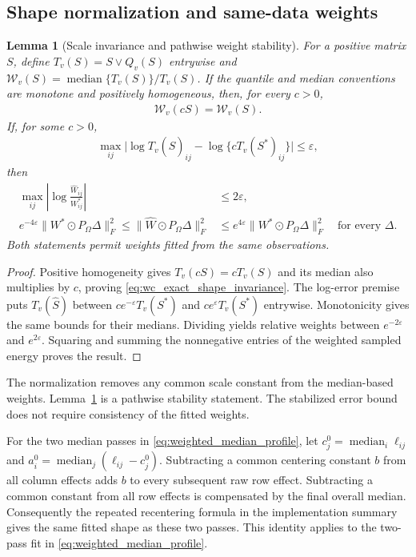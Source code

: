 \documentclass[numsec,webpdf,modern,large,namedate]{oup-authoring-template}
\theoremstyle{plain}
\newtheorem{slemma}{Lemma}%
\theoremstyle{remark}
\newif\ifmarkchanges
\newenvironment{revision}{\begingroup\ifmarkchanges\color{red}\fi}{\endgroup}
\begin{document}
\begin{revision}
\subsection{Shape normalization and same-data weights}
\begin{slemma}[Scale invariance and pathwise weight stability]
\label{lem:wc_weight_stability}
For a positive matrix $S$, define $T_v(S)=S\vee Q_v(S)$ entrywise and
$\mathcal W_v(S)=\operatorname{median}\{T_v(S)\}/T_v(S)$.
If the quantile and median conventions are monotone and positively
homogeneous, then, for every $c>0$,
\begin{align}
 \mathcal W_v(cS)=\mathcal W_v(S).
 \label{eq:wc_exact_shape_invariance}
\end{align}
If, for some $c>0$,
\begin{align*}
 \max_{ij}\bigl|\log T_v(\widehat S)_{ij}
                    -\log\{cT_v(S^*)_{ij}\}\bigr|\le\varepsilon,
\end{align*}
then
\begin{align}
 \max_{ij}\left|\log\frac{\widehat W_{ij}}{W^*_{ij}}\right|
 &\le2\varepsilon,\label{eq:wc_weight_log_error}\\
 e^{-4\varepsilon}\|W^*\odot P_\Omega\Delta\|_F^2
 \le\|\widehat W\odot P_\Omega\Delta\|_F^2
 &\le e^{4\varepsilon}\|W^*\odot P_\Omega\Delta\|_F^2
 \quad\text{for every }\Delta.
 \label{eq:wc_weight_energy_transfer}
\end{align}
Both statements permit weights fitted from the same observations.
\end{slemma}
\begin{proof}
Positive homogeneity gives $T_v(cS)=cT_v(S)$ and its median also multiplies
by $c$, proving \eqref{eq:wc_exact_shape_invariance}. The log-error premise
puts $T_v(\widehat S)$ between $ce^{-\varepsilon}T_v(S^*)$ and
$ce^{\varepsilon}T_v(S^*)$ entrywise. Monotonicity gives the same bounds
for their medians. Dividing yields relative weights between
$e^{-2\varepsilon}$ and $e^{2\varepsilon}$. Squaring and summing the
nonnegative entries of the weighted sampled energy proves the result.
\end{proof}

The normalization removes any common scale constant from the median-based weights. Lemma~\ref{lem:wc_weight_stability} is a pathwise stability statement. The stabilized error bound does not require consistency of the fitted weights.

For the two median passes in \eqref{eq:weighted_median_profile},
let $c_j^0=\operatorname{median}_i\ell_{ij}$ and
$a_i^0=\operatorname{median}_j(\ell_{ij}-c_j^0)$.
Subtracting a common centering constant $b$ from all column effects adds
$b$ to every subsequent raw row effect. Subtracting a common constant
from all row effects is compensated by the final overall median.
Consequently the repeated recentering formula in the implementation
summary gives the same fitted shape as these two passes. This identity applies to the two-pass fit in \eqref{eq:weighted_median_profile}.


\end{revision}
\end{document}
